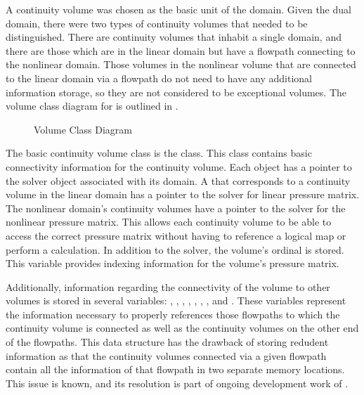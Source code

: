 A continuity volume was chosen as the basic unit of the domain.
Given the dual domain, there were two types of continuity volumes that needed to be distinguished.
There are continuity volumes that inhabit a single domain, and there are those which are in the linear domain but have a flowpath connecting to the nonlinear domain.
Those volumes in the nonlinear volume that are connected to the linear domain via a flowpath do not need to have any additional information storage, so they are not considered to be exceptional volumes.
The volume class diagram for \cobra{} is outlined in .

\begin{figure}[ht!]
\singlespace\centering

\caption{Volume Class Diagram}
\label{fig:volumeClassDiagram}
\end{figure}

The basic continuity volume class is the  class.
This class contains basic connectivity information for the continuity volume.
Each  object has a pointer to the solver object associated with its domain.
A  that corresponds to a continuity volume in the linear domain has a  pointer to the solver for linear pressure matrix.
The nonlinear domain's continuity volumes have a  pointer to the solver for the nonlinear pressure matrix.
This allows each continuity volume to be able to access the correct pressure matrix without having to reference a logical map or perform a calculation.
In addition to the solver, the volume's ordinal is stored.
This variable provides indexing information for the volume's pressure matrix.

Additionally, information regarding the connectivity of the volume to other volumes is stored in several variables: , , , , , , , and .
These variables represent the information necessary to properly references those flowpaths to which the continuity volume is connected as well as the continuity volumes on the other end of the flowpaths.
This data structure has the drawback of storing redudent information as that the continuity volumes connected via a given flowpath contain all the information of that flowpath in two separate memory locations.
This issue is known, and its resolution is part of ongoing development work of \cobra{}.

